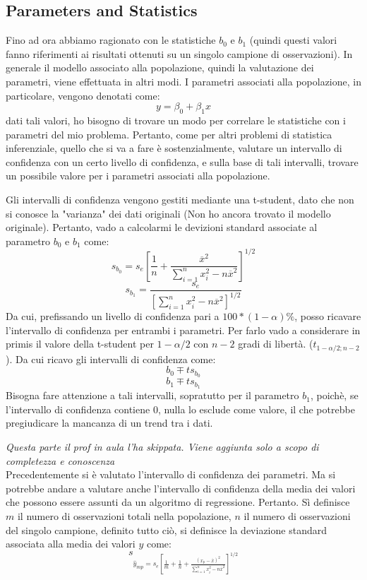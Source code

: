 \subsection{Parameters and Statistics}
Fino ad ora abbiamo ragionato con le statistiche \(b_0\) e \(b_1\) (quindi questi valori fanno riferimenti ai risultati ottenuti su un singolo campione di osservazioni). In generale il modello associato alla popolazione, quindi la valutazione dei parametri, viene effettuata in altri modi. I parametri associati alla popolazione, in particolare, vengono denotati come:
\[
y = \beta_0 + \beta_1 x
\]
dati tali valori, ho bisogno di trovare un modo per correlare le statistiche con i parametri del mio problema. Pertanto, come per altri problemi di statistica inferenziale, quello che si va a fare è sostenzialmente, valutare un intervallo di confidenza con un certo livello di confidenza, e sulla base di tali intervalli, trovare un possibile valore per i parametri associati alla popolazione.

Gli intervalli di confidenza vengono gestiti mediante una t-student, dato che non si conosce la "varianza" dei dati originali (Non ho ancora trovato il modello originale). Pertanto, vado a calcolarmi le devizioni standard associate al parametro \(b_0\) e \(b_1\) come:
\[
s_{b_0} = s_e \left [ \frac{1}{n} + \frac{\overline{x}^2}{\sum_{i=1}^{n}x_i^2 - n \overline{x}^2}\right ]^{1/2}
\]
\[
s_{b_1} = \frac{s_e}{[\sum_{i=1}^{n}x_i^2 - n \overline{x}^2]^{1/2}}
\]
Da cui, prefissando un livello di confidenza pari a \(100*(1-\alpha)\%\), posso ricavare l'intervallo di confidenza per entrambi i parametri. Per farlo vado a considerare in primis il valore della t-student per \(1 - \alpha/2\) con \(n - 2\) gradi di libertà. (\(t_{1-\alpha/2; n-2}\)). Da cui ricavo gli intervalli di confidenza come:
\[
b_0 \mp t s_{b_0}
\]
\[
b_1 \mp t s_{b_1}
\]
Bisogna fare attenzione a tali intervalli, sopratutto per il parametro \(b_1\), poichè, se l'intervallo di confidenza contiene 0, nulla lo esclude come valore, il che potrebbe pregiudicare la mancanza di un trend tra i dati.

\begin{info}
\textit{Questa parte il prof in aula l'ha skippata. Viene aggiunta solo a scopo di completezza e conoscenza}
\\
Precedentemente si è valutato l'intervallo di confidenza dei parametri. Ma si potrebbe andare a valutare anche l'intervallo di confidenza della media dei valori che possono essere assunti da un algoritmo di regressione. Pertanto. Sì definisce \(m\) il numero di osservazioni totali nella popolazione, \(n\) il numero di osservazioni del singolo campione, definito tutto ciò, si definisce la deviazione standard associata alla media dei valori \(y\) come:
\[
s_{\hat{y}_{mp} = s_e \left [ \frac{1}{m} + \frac{1}{n} + \frac{(x_p - \overline{x})^2}{\sum_{i=1}^{n}x_i^2 - n \overline{x}^2}\right ]^{1/2}}
\]
\end{info}

